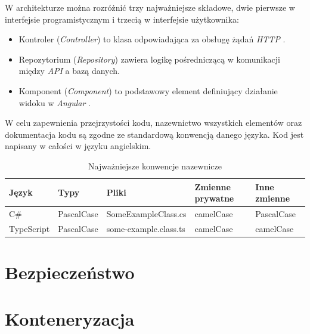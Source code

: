 \documentclass[eng,printmode,openany]{mgr}
\begin{document}
W architekturze można rozróżnić trzy najważniejsze składowe, dwie pierwsze w interfejsie programistycznym i trzecią w interfejsie użytkownika:
\begin{itemize}
	\item Kontroler (\textit{Controller}) to klasa odpowiadająca za obsługę żądań \textit{HTTP} \cite{msdn-aspnet-api}.
	\item Repozytorium (\textit{Repository}) zawiera logikę pośredniczącą w komunikacji między \textit{API} a bazą danych.
	\item Komponent (\textit{Component}) to podstawowy element definiujący działanie widoku w \textit{Angular} \cite{angular-components}.
\end{itemize}

W celu zapewnienia przejrzystości kodu, nazewnictwo wszystkich elementów oraz dokumentacja kodu są zgodne ze standardową konwencją danego języka. Kod jest napisany w całości w języku angielskim.
\begin{table}[H]
	\begin{tabularx}{\textwidth}{|l|l|l|l|l|}
		\hline
		Język      & Typy       & Pliki                 & Zmienne prywatne & Inne zmienne \\ \hline
		C\#        & PascalCase & SomeExampleClass.cs   & camelCase        & PascalCase   \\ \hline
		TypeScript & PascalCase & some-example.class.ts & camelCase        & camelCase    \\ \hline
	\end{tabularx}
	\caption{Najważniejsze konwencje nazewnicze}
\end{table}

\section{Bezpieczeństwo}
\section{Konteneryzacja}

\newpage
\end{document}

